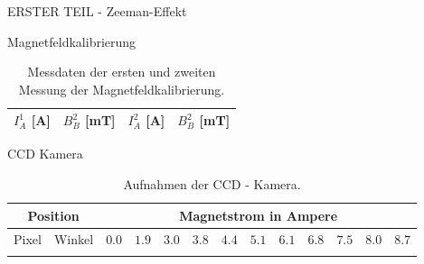 \begin{appendix}
  \label{Anhang}
  
  
  
  \begin{chapter}{ERSTER TEIL - Zeeman-Effekt}
    \label{Anhang:chp:Zeeman}
    
    
    
    \begin{section}{Magnetfeldkalibrierung}
      \label{Anhang:chp:Zeemanmagnetfeld}
      
      \begin{table}[htbp]
        \centering
        \footnotesize
        \begin{tabular}{|c|c|c|c|}
          \hline
          $I_{A}^{1}$ [A] & $B_{B}^{2}$ [mT] & $I_{A}^{2}$ [A] & $B_{B}^{2}$ 
              [mT] \\ \hline
          
        \end{tabular}
        \caption{Messdaten der ersten und zweiten Messung der 
            Magnetfeldkalibrierung.}
        \label{tab:Magnetfeldkalibrierung}
      \end{table}
      
    \end{section}
    
    
    
    \begin{section}{CCD Kamera}
      \label{Anhang:chp:Zeemanccd}
      
      \begin{scriptsize}
        \begin{longtable}[htbp]{|c|c|c|c|c|c|c|c|c|c|c|c|c|}
          \hline
          \multicolumn{2}{|c|}{Position} & \multicolumn{11}{|c|}{Magnetstrom 
              in Ampere}\\ \hline
          Pixel & Winkel & $0.0$ & $1.9$ & $3.0$ & $3.8$ & $4.4$ & $5.1$ & 
              $6.1$ & $6.8$ & $7.5$ & $8.0$ & $8.7$ \\ \hline\hline \endhead
          
          \caption{Aufnahmen der CCD - Kamera.}
          \label{tab:CCD}
        \end{longtable}
      \end{scriptsize}
      

\end{section}
\end{chapter}
\end{appendix}
